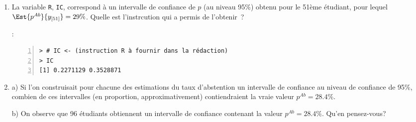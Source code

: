 \documentclass[10pt]{report}
\begin{document}
\begin{exercice}
\begin{enumerate}
\item La variable \texttt{R}, \texttt{IC}, correspond à un intervalle de confiance de $p$ (au niveau 95\%) obtenu pour le 51{\`e}me {\'e}tudiant, pour lequel $\Est{p^{Ab}}{y_{[51]}}=29\%$. Quelle est l'instrcution qui a permis de l'obtenir~?

 : 

\begin{Verbatim}[frame=leftline,fontfamily=tt,fontshape=n,numbers=left]
> # IC <- (instruction R à fournir dans la rédaction)
> IC
[1] 0.2271129 0.3528871
\end{Verbatim}




\item a) Si l'on construisait pour chacune des estimations du taux d'abstention un intervalle de confiance au niveau de confiance de 95\%, combien de ces intervalles (en proportion, approximativement) contiendraient la vraie valeur $p^{Ab}=28.4\%$.



b) On observe que 96 {\'e}tudiants obtiennent un intervalle de confiance contenant la valeur $p^{Ab}=28.4\%$. Qu'en pensez-vous? 




\end{enumerate}
\end{exercice}
\end{document}

